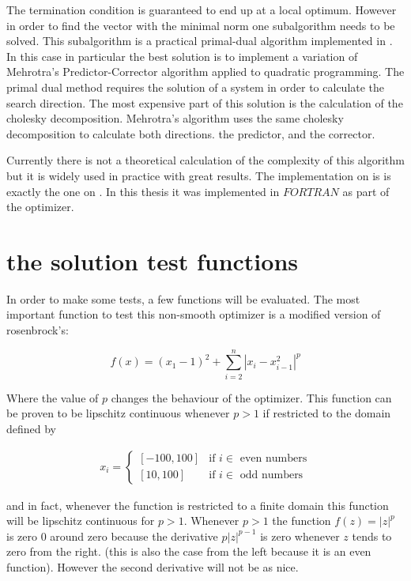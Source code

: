 The termination condition is guaranteed to end up at a local optimum. However in order to find the vector with the minimal norm one subalgorithm needs to be solved. This subalgorithm is a practical primal-dual algorithm implemented in \citep{skaaja}. In this case in particular the best solution is to implement a variation of Mehrotra's Predictor-Corrector algorithm applied to quadratic programming. The primal dual method requires the solution of a system in order to calculate the search direction. The most expensive part of this solution is the calculation of the cholesky decomposition. Mehrotra's algorithm uses the same cholesky decomposition to calculate both directions. the predictor, and the corrector.

Currently there is not a theoretical calculation of the complexity of this algorithm but it is widely used in practice with great results. The implementation on \citep{skaaja} is is exactly the one on \citep{nocedal}. In this thesis it was implemented in $FORTRAN$ as part of the optimizer.

\chapter{the solution test functions}

In order to make some tests, a few functions will be evaluated. The most important function to test this non-smooth optimizer is a modified version of rosenbrock's:

\begin{equation}
    f(x) = (x_1 - 1)^2 + \sum_{i = 2}^n |x_i - x_{i - 1}^2|^p
\end{equation}

Where the value of $p$ changes the behaviour of the optimizer. This function can be proven to be lipschitz continuous whenever $p > 1$ if restricted to the domain defined by  

\begin{equation}
  \begin{aligned}
    x_i = 
    \begin{cases}
      [-100, 100] & \text{if } i \in \text{ even numbers} \\
      [10, 100] & \text{if } i \in \text{ odd numbers}
    \end{cases}
  \end{aligned}
\end{equation}

and in fact, whenever the function is restricted to a finite domain this function will be lipschitz continuous for $p > 1$. Whenever $p > 1$ the function $f(z) = |z|^p$ is zero $0$ around zero because the derivative $p |z| ^{p-1}$ is zero whenever $z$ tends to zero from the right. (this is also the case from the left because it is an even function). However the second derivative will not be as nice.

